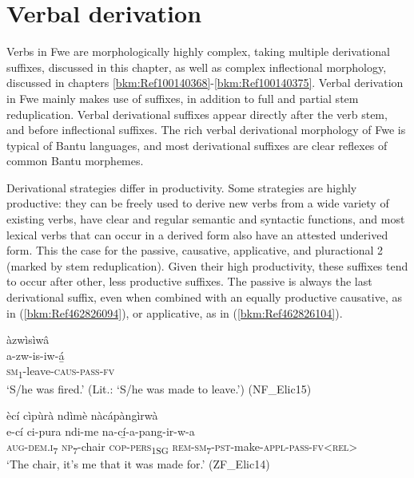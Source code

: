 \chapter{Verbal derivation}
\label{bkm:Ref99105347}\label{bkm:Ref98758856}\label{bkm:Ref97890592}\hypertarget{Toc75352657}{}
Verbs in Fwe are morphologically highly complex, taking multiple derivational suffixes, discussed in this chapter, as well as complex inflectional morphology, discussed in chapters \ref{bkm:Ref100140368}-\ref{bkm:Ref100140375}. Verbal derivation in Fwe mainly makes use of suffixes, in addition to full and partial stem reduplication. Verbal derivational suffixes appear directly after the verb stem, and before inflectional suffixes. The rich verbal derivational morphology of Fwe is typical of Bantu languages, and most derivational suffixes are clear reflexes of common Bantu morphemes.

Derivational strategies differ in productivity. Some strategies are highly productive: they can be freely used to derive new verbs from a wide variety of existing verbs, have clear and regular semantic and syntactic functions, and most lexical verbs that can occur in a derived form also have an attested underived form. This the case for the passive, causative, applicative, and pluractional 2 (marked by stem reduplication). Given their high productivity, these suffixes tend to occur after other, less productive suffixes. The passive is always the last derivational suffix, even when combined with an equally productive causative, as in (\ref{bkm:Ref462826094}), or applicative, as in (\ref{bkm:Ref462826104}).

\ea
\label{bkm:Ref462826094}
\glll àzwìsìwâ\\
a-zw-is-iw-á̲\\
\textsc{sm}\textsubscript{1}-leave-\textsc{caus}-\textsc{pass}-\textsc{fv}\\
\glt ‘S/he was fired.’ (Lit.: ‘S/he was made to leave.’) (NF\_Elic15)
\z

\ea
\label{bkm:Ref462826104}
ècí cìpùrà ndìmè nàcápàngìrwà\\
\gll e-cí    ci-pura  ndi-me  na-cí̲-a-pang-ir-w-a\\
\textsc{aug}-\textsc{dem}.\textsc{i}\textsubscript{7}  \textsc{np}\textsubscript{7}-chair  \textsc{cop}-\textsc{pers}\textsubscript{1SG}  \textsc{rem}-\textsc{sm}\textsubscript{7}-\textsc{pst}-make-\textsc{appl}-\textsc{pass}-\textsc{fv}<\textsc{rel}>\\
\glt ‘The chair, it’s me that it was made for.’ (ZF\_Elic14)
\z

